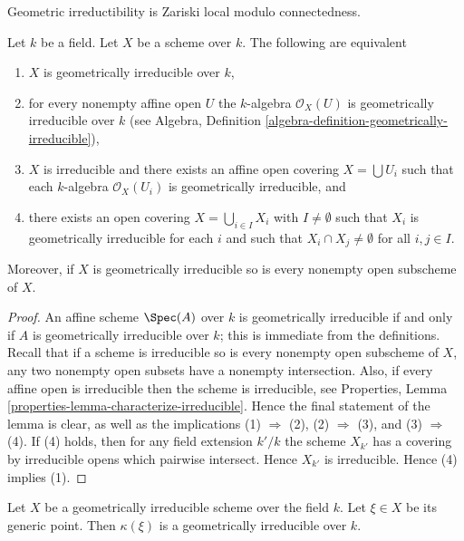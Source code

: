 \begin{lemma}
\label{lemma-geometrically-irreducible-local}
\begin{slogan}
Geometric irreductibility is Zariski local modulo connectedness.
\end{slogan}
Let $k$ be a field. Let $X$ be a scheme over $k$.
The following are equivalent
\begin{enumerate}
\item $X$ is geometrically irreducible over $k$,
\item for every nonempty affine open $U$ the $k$-algebra $\mathcal{O}_X(U)$
is geometrically irreducible over $k$ (see
Algebra, Definition \ref{algebra-definition-geometrically-irreducible}),
\item $X$ is irreducible and there exists an affine open covering
$X = \bigcup U_i$ such that each $k$-algebra $\mathcal{O}_X(U_i)$ is
geometrically irreducible, and
\item there exists an open covering $X = \bigcup_{i \in I} X_i$
with $I \not = \emptyset$ such
that $X_i$ is geometrically irreducible for each $i$ and such that
$X_i \cap X_j \not = \emptyset$ for all $i, j \in I$.
\end{enumerate}
Moreover, if $X$ is geometrically irreducible so is every nonempty
open subscheme of $X$.
\end{lemma}

\begin{proof}
An affine scheme $\Spec(A)$ over $k$ is geometrically
irreducible if and only if $A$ is geometrically irreducible over $k$;
this is immediate from the definitions.
Recall that if a scheme is irreducible so is every nonempty
open subscheme of $X$, any two nonempty open subsets have
a nonempty intersection. Also, if every affine open is irreducible
then the scheme is irreducible, see Properties,
Lemma \ref{properties-lemma-characterize-irreducible}.
Hence the final statement of the lemma
is clear, as well as the implications (1) $\Rightarrow$ (2),
(2) $\Rightarrow$ (3), and (3) $\Rightarrow$ (4). If (4) holds,
then for any field extension $k'/k$ the scheme $X_{k'}$
has a covering by irreducible opens which pairwise intersect.
Hence $X_{k'}$ is irreducible. Hence (4) implies (1).
\end{proof}

\begin{lemma}
\label{lemma-geometrically-irreducible-function-field}
Let $X$ be a geometrically irreducible scheme over the field $k$.
Let $\xi \in X$ be its generic point. Then $\kappa(\xi)$ is a
geometrically irreducible over $k$.
\end{lemma}

